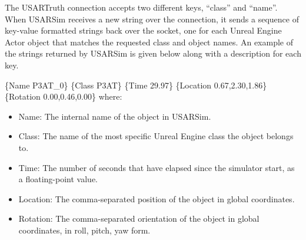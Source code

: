 The USARTruth connection accepts two different keys, ``class'' and ``name''. When USARSim receives a new string over the connection, it sends a sequence of key-value formatted strings back over the socket, one for each Unreal Engine Actor object that matches the requested class and object names. An example of the strings returned by USARSim is given below along with a description for each key.


\{Name P3AT\_0\} \{Class P3AT\} \{Time 29.97\} \{Location 0.67,2.30,1.86\} \\ \{Rotation 0.00,0.46,0.00\} where:

\begin{itemize}
\item Name: The internal name of the object in USARSim.
\item Class: The name of the most specific Unreal Engine class the object belongs to.
\item Time: The number of seconds that have elapsed since the simulator start, as a floating-point value.
\item Location: The comma-separated position of the object in global coordinates.
\item Rotation: The comma-separated orientation of the object in global coordinates, in roll, pitch, yaw form.
\end{itemize}



%
